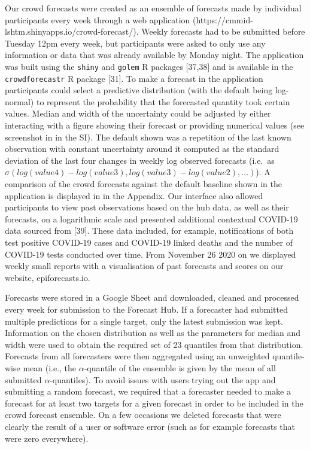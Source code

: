 \documentclass[10pt,letterpaper]{article}
\begin{document}
Our crowd forecasts were created as an ensemble of forecasts made by
individual participants every week through a web application
(https://cmmid-lshtm.shinyapps.io/crowd-forecast/). Weekly forecasts had
to be submitted before Tuesday 12pm every week, but participants were
asked to only use any information or data that was already available by
Monday night. The application was built using the \texttt{shiny} and
\texttt{golem} R packages {[}37,38{]} and is available in the
\texttt{crowdforecastr} R package {[}31{]}. To make a forecast in the
application participants could select a predictive distribution (with
the default being log-normal) to represent the probability that the
forecasted quantity took certain values. Median and width of the
uncertainty could be adjusted by either interacting with a figure
showing their forecast or providing numerical values (see screenshot in
 in the SI). The default shown was a repetition
of the last known observation with constant uncertainty around it
computed as the standard deviation of the last four changes in weekly
log observed forecasts (i.e.~as
\(\sigma(log(value4) - log(value3), log(value3) - log(value2), \ldots )\)).
A comparison of the crowd forecasts against the default baseline shown
in the application is displayed in  in
the Appendix. Our interface also allowed participants to view past
observations based on the hub data, as well as their forecasts, on a
logarithmic scale and presented additional contextual COVID-19 data
sourced from {[}39{]}. These data included, for example, notifications
of both test positive COVID-19 cases and COVID-19 linked deaths and the
number of COVID-19 tests conducted over time. From November 26 2020 on
we displayed weekly small reports with a visualisation of past forecasts
and scores on our website, epiforecasts.io.

Forecasts were stored in a Google Sheet and downloaded, cleaned and
processed every week for submission to the Forecast Hub. If a forecaster
had submitted multiple predictions for a single target, only the latest
submission was kept. Information on the chosen distribution as well as
the parameters for median and width were used to obtain the required set
of 23 quantiles from that distribution. Forecasts from all forecasters
were then aggregated using an unweighted quantile-wise mean (i.e., the
\(\alpha\)-quantile of the ensemble is given by the mean of all
submitted \(\alpha\)-quantiles). To avoid issues with users trying out
the app and submitting a random forecast, we required that a forecaster
needed to make a forecast for at least two targets for a given forecast
in order to be included in the crowd forecast ensemble. On a few
occasions we deleted forecasts that were clearly the result of a user or
software error (such as for example forecasts that were zero
everywhere).
\end{document}

